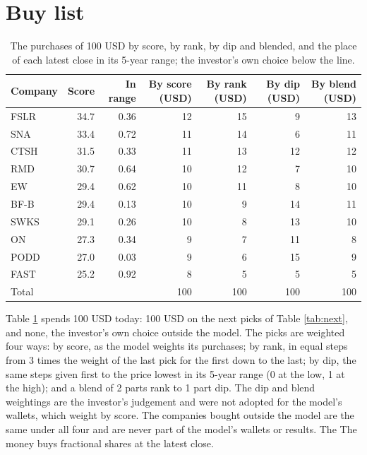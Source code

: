 \documentclass[11pt,a4paper]{article}
\begin{document}
\section{Buy list}
\label{sec:buy-list}
\begin{table}[H]
\centering
\small
\caption{The purchases of 100 USD by score, by rank, by dip and blended, and the place of each latest close in its 5-year range; the investor's own choice below the line.}\label{tab:buy-list}
\begin{tabular}{l r r r r r r}
\hline
Company & Score & In range & By score (USD) & By rank (USD) & By dip (USD) & By blend (USD) \\
\hline
FSLR & 34.7 & 0.36 & 12 & 15 & 9 & 13 \\
SNA & 33.4 & 0.72 & 11 & 14 & 6 & 11 \\
CTSH & 31.5 & 0.33 & 11 & 13 & 12 & 12 \\
RMD & 30.7 & 0.64 & 10 & 12 & 7 & 10 \\
EW & 29.4 & 0.62 & 10 & 11 & 8 & 10 \\
BF-B & 29.4 & 0.13 & 10 & 9 & 14 & 11 \\
SWKS & 29.1 & 0.26 & 10 & 8 & 13 & 10 \\
ON & 27.3 & 0.34 & 9 & 7 & 11 & 8 \\
PODD & 27.0 & 0.03 & 9 & 6 & 15 & 9 \\
FAST & 25.2 & 0.92 & 8 & 5 & 5 & 5 \\
\hline
Total &  &  & 100 & 100 & 100 & 100 \\
\hline
\end{tabular}
\end{table}
Table \ref{tab:buy-list} spends 100 USD today: 100 USD on the next picks of Table \ref{tab:next}, and none, the investor's own choice outside the model. The picks are weighted four ways: by score, as the model weights its purchases; by rank, in equal steps from 3 times the weight of the last pick for the first down to the last; by dip, the same steps given first to the price lowest in its 5-year range (0 at the low, 1 at the high); and a blend of 2 parts rank to 1 part dip. The dip and blend weightings are the investor's judgement and were not adopted for the model's wallets, which weight by score. The companies bought outside the model are the same under all four and are never part of the model's wallets or results. The The money buys fractional shares at the latest close.
\end{document}
